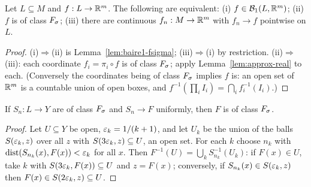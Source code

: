 \begin{theorem}\label{thm:baire1-char}
Let $L\subseteq M$ and $f:L\to\mathbb{R}^m$. The following are equivalent:
(i) $f\in\mathcal B_1(L,\mathbb{R}^m)$; (ii) $f$ is of class $F_\sigma$; (iii) there are continuous
$f_n:M\to\mathbb{R}^m$ with $f_n\to f$ pointwise on $L$.
\end{theorem}
\begin{proof}
(i)$\Rightarrow$(ii) is Lemma~\ref{lem:baire1-fsigma}; (iii)$\Rightarrow$(i) by restriction. (ii)$\Rightarrow$(iii):
each coordinate $f_i=\pi_i\circ f$ is of class $F_\sigma$; apply Lemma~\ref{lem:approx-real} to each. (Conversely
the coordinates being of class $F_\sigma$ implies $f$ is: an open set of $\mathbb{R}^m$ is a countable union of open
boxes, and $f^{-1}(\prod_iI_i)=\bigcap_if_i^{-1}(I_i)$.)
\end{proof}

\begin{lemma}\label{lem:uniform-limit-fsigma}
If $S_n:L\to Y$ are of class $F_\sigma$ and $S_n\to F$ uniformly, then $F$ is of class $F_\sigma$.
\end{lemma}
\begin{proof}
Let $U\subseteq Y$ be open, $\varepsilon_k=1/(k+1)$, and let $U_k$ be the union of the balls $S(\varepsilon_k,z)$ over
all $z$ with $S(3\varepsilon_k,z)\subseteq U$, an open set. For each $k$ choose $n_k$ with
$\operatorname{dist}(S_{n_k}(x),F(x))<\varepsilon_k$ for all $x$. Then $F^{-1}(U)=\bigcup_kS_{n_k}^{-1}(U_k)$: if $F(x)\in U$,
take $k$ with $S(3\varepsilon_k,F(x))\subseteq U$ and $z=F(x)$; conversely, if $S_{n_k}(x)\in S(\varepsilon_k,z)$ then
$F(x)\in S(2\varepsilon_k,z)\subseteq U$.
\end{proof}

